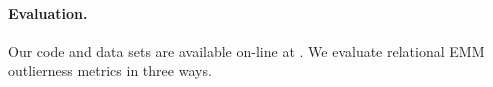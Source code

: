 {%
%
%
%
%
\paragraph{Evaluation.} Our code and data sets are available on-line at \citep{url}. We evaluate relational EMM outlierness metrics in three ways.

}
